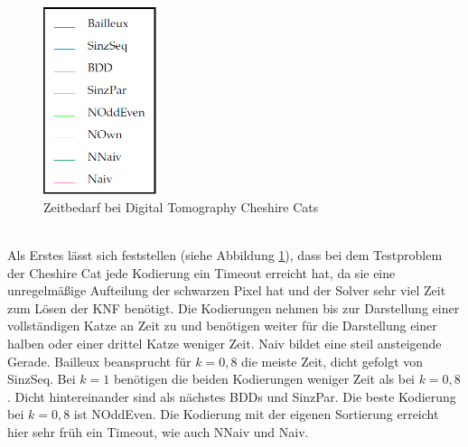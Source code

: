 \documentclass[a4,abstract=on]{scrartcl}
\begin{document}

\begin{figure}[htbp]
\includegraphics[width=3.3cm]{legende.png}
\caption{Zeitbedarf bei Digital Tomography Cheshire Cats}
\label{fig:cheshire}
\end{figure}
\ \\
Als Erstes lässt sich feststellen (siehe Abbildung \ref{fig:cheshire}), dass bei dem Testproblem der Cheshire Cat jede Kodierung ein Timeout erreicht hat, da sie eine unregelmäßige Aufteilung der schwarzen Pixel hat und der Solver sehr viel Zeit zum Lösen der KNF benötigt. Die Kodierungen nehmen bis zur Darstellung einer vollständigen Katze an Zeit zu und benötigen weiter für die Darstellung einer halben oder einer drittel Katze weniger Zeit. Naiv bildet eine steil ansteigende Gerade. Bailleux beansprucht für $k=0,8$ die meiste Zeit, dicht gefolgt von SinzSeq. Bei $k=1$ benötigen die beiden Kodierungen weniger Zeit als bei $k=0,8$. Dicht hintereinander sind als nächstes BDDs und SinzPar. Die beste Kodierung bei $k=0,8$ ist NOddEven. Die Kodierung mit der eigenen Sortierung erreicht hier sehr früh ein Timeout, wie auch NNaiv und Naiv. 
\end{document}
